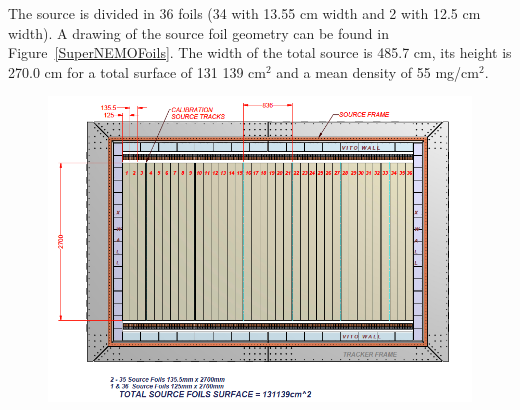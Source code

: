 \documentclass[main.tex]{subfiles}
\begin{document}
\bigskip


\NI The source is divided in 36 foils (34 with 13.55 cm width and 2 with 12.5 cm width). A drawing of the source foil geometry can be found in Figure~\ref{SuperNEMOFoils}. The width of the total source is 485.7 cm, its height is 270.0 cm for a total surface of 131 139 cm$^\text{2}$ and a mean density of 55 mg/cm$^\text{2}$.


\begin{figure}[h!]
\begin{center}
\includegraphics[scale=0.33]{pictures/Chap3/foil.png}

\end{center}
\end{figure}
\end{document}
